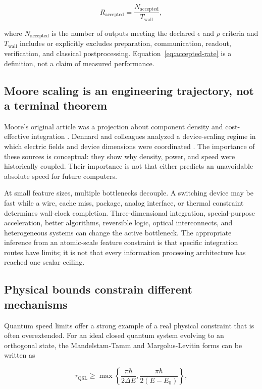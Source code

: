 \documentclass[conference]{IEEEtran}
\begin{document}
\begin{equation}
R_{\mathrm{accepted}} =
\frac{N_{\mathrm{accepted}}}{T_{\mathrm{wall}}},
\label{eq:accepted-rate}
\end{equation}

where \(N_{\mathrm{accepted}}\) is the number of outputs meeting the declared
\(\epsilon\) and \(\rho\) criteria and \(T_{\mathrm{wall}}\) includes or
explicitly excludes preparation, communication, readout, verification, and
classical postprocessing. Equation~\eqref{eq:accepted-rate} is a definition,
not a claim of measured performance.

\subsection{Moore scaling is an engineering trajectory, not a terminal theorem}

Moore's original article was a projection about component density and
cost-effective integration \cite{moore}. Dennard and colleagues analyzed a
device-scaling regime in which electric fields and device dimensions were
coordinated \cite{dennard}. The importance of these sources is conceptual:
they show why density, power, and speed were historically coupled. Their
importance is not that either predicts an unavoidable absolute speed for
future computers.

At small feature sizes, multiple bottlenecks decouple. A switching device may
be fast while a wire, cache miss, package, analog interface, or thermal
constraint determines wall-clock completion. Three-dimensional integration,
special-purpose acceleration, better algorithms, reversible logic, optical
interconnects, and heterogeneous systems can change the active bottleneck.
The appropriate inference from an atomic-scale feature constraint is that
specific integration routes have limits; it is not that every information
processing architecture has reached one scalar ceiling.

\subsection{Physical bounds constrain different mechanisms}

Quantum speed limits offer a strong example of a real physical constraint that
is often overextended. For an ideal closed quantum system evolving to an
orthogonal state, the Mandelstam-Tamm and Margolus-Levitin forms can be
written as

\begin{equation}
\tau_{\mathrm{QSL}} \geq
\max\left\{\frac{\pi\hbar}{2\Delta E},
\frac{\pi\hbar}{2(E-E_0)}\right\},
\label{eq:qsl}
\end{equation}
\end{document}
